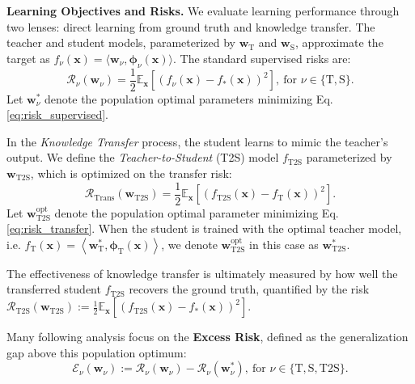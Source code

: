 \documentclass{article}
\theoremstyle{definition}
\theoremstyle{definition}
\theoremstyle{plain}
\theoremstyle{plain}
\theoremstyle{plain}
\theoremstyle{plain}
\theoremstyle{plain}
\newcommand{\bs}[1]{\boldsymbol{\mathbf{#1}}}
\newcommand{\vecx}{\mathbf{x}}
\newcommand{\te}{\mathrm{T}}
\newcommand{\st}{\mathrm{S}}
\newcommand{\ts}{\mathrm{T2S}}
\newcommand{\opt}{\mathrm{opt}}
\newcommand{\M}{\mathbf{M}}
\newcommand{\w}{\mathbf{w}}
\newcommand{\inner}[1]{\left\langle#1\right\rangle}
\begin{document}
\textbf{Learning Objectives and Risks.}
We evaluate learning performance through two lenses: direct learning from ground truth and knowledge transfer.
The teacher and student models, parameterized by $\mathbf{w}_\te$ and $\mathbf{w}_\st$, approximate the target as $f_\nu(\mathbf{x}) = \langle \mathbf{w}_\nu, \boldsymbol{\phi}_\nu(\mathbf{x}) \rangle$. The standard supervised risks are:
\begin{equation}\label{eq:risk_supervised}
    \!\!\!\mathcal{R}_\nu(\mathbf{w}_\nu) = \frac{1}{2}\mathbb{E}_{\mathbf{x}}\left[ (f_\nu(\mathbf{x}) - f_*(\mathbf{x}))^2 \right], \ \text{for } \nu \in \{\te, \st\}.
\end{equation}
Let $\mathbf{w}_{\nu}^*$ denote the population optimal parameters minimizing Eq. \eqref{eq:risk_supervised}. 

In the \textit{Knowledge Transfer} process, the student learns to mimic the teacher's output. We define the \textit{Teacher-to-Student} (T2S) model $f_\mathrm{T2S}$ parameterized by $\mathbf{w}_\mathrm{T2S}$, which is optimized on the transfer risk:
\begin{equation}\label{eq:risk_transfer}
    \mathcal{R}_{\mathrm{Trans}}(\mathbf{w}_\mathrm{T2S}) = \frac{1}{2}\mathbb{E}_{\mathbf{x}}\left[ (f_\mathrm{T2S}(\mathbf{x}) - f_\te(\mathbf{x}))^2 \right].
\end{equation}
Let $\mathbf{w}_{\ts}^\opt$ denote the population optimal parameter minimizing Eq. \eqref{eq:risk_transfer}. When the student is trained with the optimal teacher model, i.e. $f_\te(\vecx) = \inner{\w_\te^*,\bs\phi_\te(\vecx)}$, we denote $\mathbf{w}_{\ts}^\opt$ in this case as $\mathbf{w}_{\ts}^*$.

The effectiveness of knowledge transfer is ultimately measured by how well the transferred student $f_\mathrm{T2S}$ recovers the ground truth, quantified by the risk $\mathcal{R}_{\mathrm{T2S}}(\mathbf{w}_\mathrm{T2S}) := \frac{1}{2}\mathbb{E}_{\mathbf{x}}[ (f_\mathrm{T2S}(\mathbf{x}) - f_*(\mathbf{x}))^2 ]$.

Many following analysis focus on the \textbf{Excess Risk}, defined as the generalization gap above this population optimum:
\begin{equation}
    \!\mathcal{E}_\nu(\mathbf{w}_\nu) := \mathcal{R}_\nu(\mathbf{w}_\nu) - \mathcal{R}_\nu(\mathbf{w}_\nu^*),\  \text{for } \nu\in \{\te,\st,\ts\}.
\end{equation}
\end{document}
